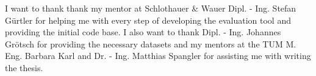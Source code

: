 \bigskip

I want to thank thank my mentor at Schlothauer \& Wauer Dipl. - Ing. Stefan Gürtler for helping me with every step of developing the evaluation tool and providing the initial code base. I also want to thank Dipl. - Ing. Johannes Grötsch for providing the necessary datasets and my mentors at the TUM M. Eng. Barbara Karl and Dr. - Ing. Matthias Spangler for assisting me with writing the thesis.